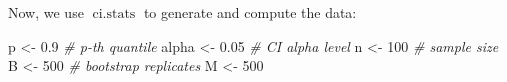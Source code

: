 \documentclass[
  11pt,
]{article}
\newenvironment{Shaded}{\begin{snugshade}}{\end{snugshade}}
\newcommand{\CommentTok}[1]{\textcolor[rgb]{0.56,0.35,0.01}{\textit{#1}}}
\newcommand{\DecValTok}[1]{\textcolor[rgb]{0.00,0.00,0.81}{#1}}
\newcommand{\FloatTok}[1]{\textcolor[rgb]{0.00,0.00,0.81}{#1}}
\newcommand{\FunctionTok}[1]{\textcolor[rgb]{0.13,0.29,0.53}{\textbf{#1}}}
\newcommand{\NormalTok}[1]{#1}
\newcommand{\OtherTok}[1]{\textcolor[rgb]{0.56,0.35,0.01}{#1}}
\newcommand{\SpecialCharTok}[1]{\textcolor[rgb]{0.81,0.36,0.00}{\textbf{#1}}}
\begin{document}
\begin{Shaded}
\end{Shaded}

Now, we use \(\operatorname{ci.stats}\) to generate and compute the
data:

\begin{Shaded}
\begin{Highlighting}[]
\NormalTok{p }\OtherTok{\textless{}{-}} \FloatTok{0.9} \CommentTok{\# p{-}th quantile}
\NormalTok{alpha }\OtherTok{\textless{}{-}} \FloatTok{0.05} \CommentTok{\# CI alpha level}
\NormalTok{n }\OtherTok{\textless{}{-}} \DecValTok{100} \CommentTok{\# sample size}
\NormalTok{B }\OtherTok{\textless{}{-}} \DecValTok{500} \CommentTok{\# bootstrap replicates}
\NormalTok{M }\OtherTok{\textless{}{-}} \DecValTok{500}


\end{Highlighting}
\end{Shaded}
\end{document}
